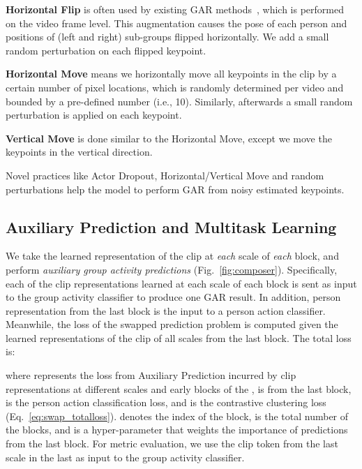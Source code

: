 \documentclass[runningheads]{llncs}
\begin{document}
\noindent \textbf{Horizontal Flip} is often used by existing GAR methods~\cite{zappardino2021learning,POGARS,GIRN}, which is performed on the video frame level. This augmentation causes the pose of each person and positions of (left and right) sub-groups flipped horizontally.
We add a small random perturbation
on each flipped keypoint. 


\noindent \textbf{Horizontal Move} means we horizontally move all keypoints in the clip by a certain number of pixel locations, which is randomly determined per video and bounded by a pre-defined number (i.e., 10). Similarly, afterwards a small random perturbation is applied
on each keypoint. 

\noindent \textbf{Vertical Move} is done similar to the Horizontal Move, except we move the keypoints in the vertical direction. 

Novel practices like Actor Dropout, Horizontal/Vertical Move and random perturbations help the model to perform GAR from noisy estimated keypoints.





\subsection{Auxiliary Prediction and Multitask Learning}
\label{subsubsection:loss}
We take the learned representation of the clip
at \textit{each} scale of \textit{each} \mtx block, and perform \textit{auxiliary group activity predictions} (Fig.~\ref{fig:composer}).
Specifically, each of the clip representations learned
at each scale of each block is sent as input to the group activity classifier to produce one GAR result.
In addition,
person representation from the last \mtx block is
the input to a person action classifier. Meanwhile, the loss of the swapped prediction problem
is computed given the learned representations of the clip 
of all  scales from the last \mtx block. The total loss is:

where  represents the loss from Auxiliary Prediction incurred by clip representations at different scales and early blocks of the \mtxeos, 
is from the last \mtx block,  is the person action classification loss, and  is the contrastive clustering loss (Eq.~\ref{eq:swap_totalloss}). 
 denotes the index of the \mtx block,  is the total number of the \mtx blocks, and  is a hyper-parameter that weights the importance of predictions from the last
block.
For metric evaluation, we use the clip
token from the last scale in the last \mtx as input to the group activity classifier.
\end{document}
